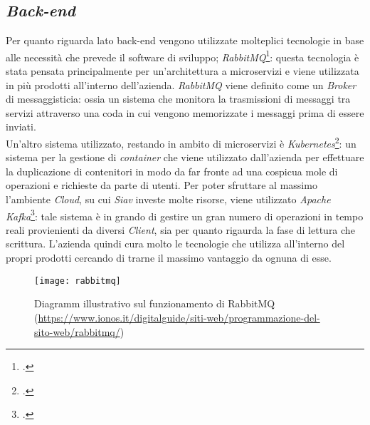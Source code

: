 \subsection{\textit{Back-end}}
Per quanto riguarda lato back-end vengono utilizzate molteplici tecnologie in base alle necessità che prevede il software di sviluppo;  \textit{RabbitMQ}\footcite{RabbitMQ: https://www.rabbitmq.com/}: questa tecnologia è stata pensata principalmente per un'architettura a microservizi e viene utilizzata in più prodotti all'interno dell'azienda. \textit{RabbitMQ} viene definito come un \textit{\gls{Broker}} di messaggisticia: ossia un sistema che monitora la trasmissioni di messaggi tra servizi attraverso una coda in cui vengono memorizzate i messaggi prima di essere inviati.\\ Un'altro sistema utilizzato, restando in ambito di microservizi è \textit{Kubernetes}\footcite{Kubernetes: https://kubernetes.io/}: un sistema per la gestione di \textit{container} che viene utilizzato dall'azienda per effettuare la duplicazione di contenitori in modo da far fronte ad una cospicua mole di operazioni e richieste da parte di utenti. Per poter sfruttare al massimo l'ambiente \textit{Cloud}, su cui \textit{Siav} investe molte risorse, viene utilizzato \textit{Apache Kafka}\footcite{Apache Kafka: https://kafka.apache.org/}: tale sistema è in grando di gestire un gran numero di operazioni in tempo reali provienienti da diversi \textit{Client}, sia per quanto rigaurda la fase di lettura che scrittura. L'azienda quindi cura molto le tecnologie che utilizza all'interno del propri prodotti cercando di trarne il massimo vantaggio da ognuna di esse. 

\begin{figure}[!h] 
	\centering 
	\texttt{[image: rabbitmq]} 
	\caption{Diagramm illustrativo sul funzionamento di RabbitMQ
	(\url{https://www.ionos.it/digitalguide/siti-web/programmazione-del-sito-web/rabbitmq/})}
\end{figure}
